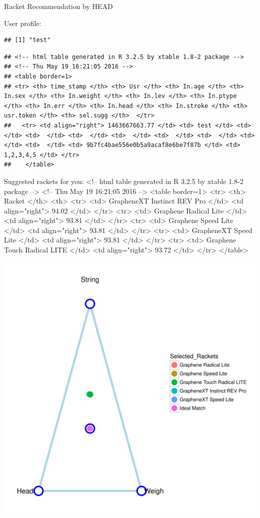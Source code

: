 Racket Recommendation by HEAD

User profile:
\begin{knitrout}
\color{fgcolor}\begin{kframe}
\begin{verbatim}
## [1] "test"
\end{verbatim}


{\ttfamily\noindent{}}\begin{verbatim}
## <!-- html table generated in R 3.2.5 by xtable 1.8-2 package -->
## <!-- Thu May 19 16:21:05 2016 -->
## <table border=1>
## <tr> <th> time_stamp </th> <th> Usr </th> <th> In.age </th> <th> In.sex </th> <th> In.weight </th> <th> In.lev </th> <th> In.ptype </th> <th> In.err </th> <th> In.head </th> <th> In.stroke </th> <th> usr.token </th> <th> sel.sugg </th>  </tr>
##   <tr> <td align="right"> 1463667663.77 </td> <td> test </td> <td>  </td> <td>  </td> <td>  </td> <td>  </td> <td>  </td> <td>  </td> <td>  </td> <td>  </td> <td> 9b7fc4bae556e0b5a9acaf8e6be7f87b </td> <td> 1,2,3,4,5 </td> </tr>
##    </table>
\end{verbatim}
\end{kframe}
\end{knitrout}


Suggested rackets for you:
<!-- html table generated in R 3.2.5 by xtable 1.8-2 package -->
<!-- Thu May 19 16:21:05 2016 -->
<table border=1>
<tr> <th> Racket </th> <th> %
  <tr> <td> GrapheneXT Instinct REV Pro </td> <td align="right"> 94.02 </td> </tr>
  <tr> <td> Graphene Radical Lite </td> <td align="right"> 93.81 </td> </tr>
  <tr> <td> Graphene Speed Lite </td> <td align="right"> 93.81 </td> </tr>
  <tr> <td> GrapheneXT Speed Lite </td> <td align="right"> 93.81 </td> </tr>
  <tr> <td> Graphene Touch Radical LITE </td> <td align="right"> 93.72 </td> </tr>
   </table>


\begin{knitrout}
\color{fgcolor}
\includegraphics[width=\maxwidth]{figure/res2-1} 

\end{knitrout}

